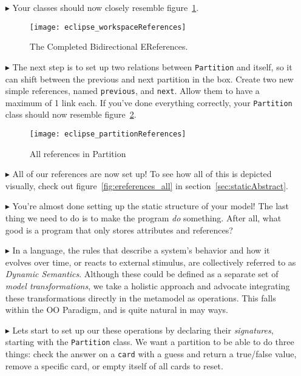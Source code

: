 \begin{itemize}
\item[$\blacktriangleright$] Your classes should now closely resemble figure~\ref{fig:allReferences}.


\begin{figure}[htbp]
	\centering
  \texttt{[image: eclipse\_workspaceReferences]}
	\caption{The Completed Bidirectional EReferences.}
	\label{fig:allReferences}
\end{figure} 


\item[$\blacktriangleright$] The next step is to set up two relations between \texttt{Partition} and itself, so it can shift between the previous and next partition in the box. Create two new simple references, named \texttt{previous}, and \texttt{next}. Allow them to have a maximum of 1 link each. If you've done everything correctly, your \texttt{Partition} class should now resemble figure~\ref{fig:partitionReferences}.

\begin{figure}[htbp]
	\centering
  \texttt{[image: eclipse\_partitionReferences]}
	\caption{All references in Partition}
	\label{fig:partitionReferences}
\end{figure} 

\item[$\blacktriangleright$] All of our references are now set up! To see how all of this is depicted visually, check out figure~\ref{fig:ereferences_all} in section~\ref{sec:staticAbstract}.

\pagebreak

\item[$\blacktriangleright$] You're almost done setting up the static structure of your model! The last thing we need to do is to make the program \emph{do} something. After all, what good is a program that only stores attributes and references?

\item[$\blacktriangleright$] In a language, the rules that describe a system's behavior and how it evolves over time, or reacts to external stimulus, are collectively referred to as \emph{Dynamic Semantics}. Although these could be defined as a separate set of \emph{model transformations}, we take a holistic approach and advocate integrating these transformations directly in the metamodel as operations. This falls within the OO Paradigm, and is quite natural in may ways.

\item[$\blacktriangleright$] Lets start to set up our these operations by declaring their \emph{signatures}, starting with the \texttt{Partition} class. We want a partition to be able to do three things: check the answer on a \texttt{card} with a guess and return a true/false value, remove a specific card, or empty itself of all cards to reset. 


\end{itemize}
